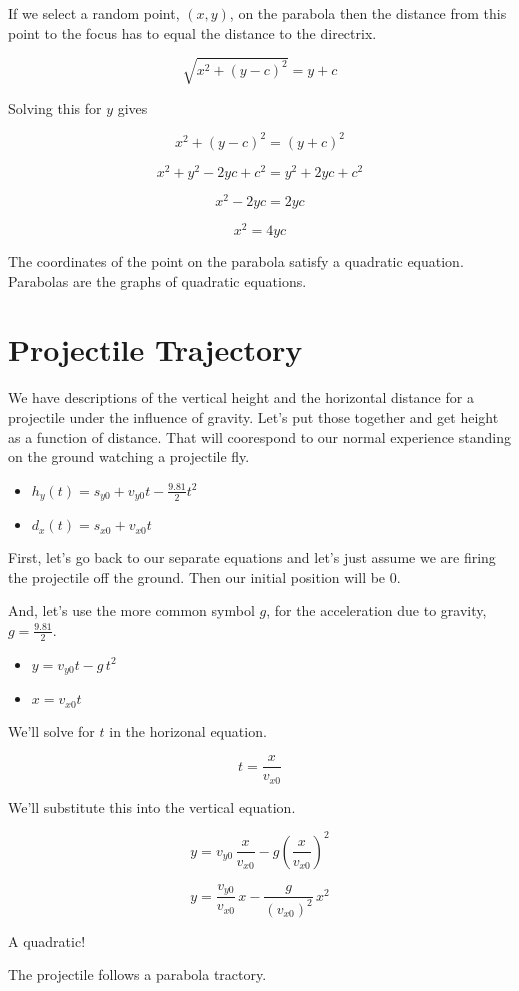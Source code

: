 \documentclass{ximera}
\begin{document}
If we select a random point, $(x,y)$, on the parabola then the distance from this point to the focus has to equal the distance to the directrix.


\[  \sqrt{x^2 + (y-c)^2} = y+c   \]


Solving this for $y$ gives


\[  x^2 + (y-c)^2 = (y+c)^2   \]

\[  x^2 + y^2 - 2 y c + c^2 = y^2 + 2 y c + c^2   \]

\[  x^2  - 2 y c  =  2 y c    \]

\[  x^2   =  4 y c    \]


The coordinates of the point on the parabola satisfy a quadratic equation.  Parabolas are the graphs of quadratic equations.












\section{Projectile Trajectory}


We have descriptions of the vertical height and the horizontal distance for a projectile under the influence of gravity.  Let's put those together and get height as a function of distance.  That will coorespond to our normal experience standing on the ground watching a projectile fly.


\begin{itemize}
\item $h_y(t) = s_{y0} + v_{y0} t - \frac{9.81}{2} t^2$


\item $d_x(t) = s_{x0} + v_{x0} t$
\end{itemize}




First, let's go back to our separate equations and let's just assume we are firing the projectile off the ground.  Then our initial position will be $0$.  

And, let's use the more common symbol $g$, for the acceleration due to gravity, $g = \frac{9.81}{2}$.




\begin{itemize}
\item $y = v_{y0} t - g \, t^2$


\item $x = v_{x0} t$
\end{itemize}


We'll solve for $t$ in the horizonal equation.


\[ t = \frac{x}{v_{x0}} \]

We'll substitute this into the vertical equation.


\[  y = v_{y0} \, \frac{x}{v_{x0}} - g \left(\frac{x}{v_{x0}}\right)^2  \]



\[  y = \frac{v_{y0}}{v_{x0}} \, x  - \frac{g}{(v_{x0})^2} \, x^2 \]



A quadratic! 

The projectile follows a parabola tractory.
\end{document}
